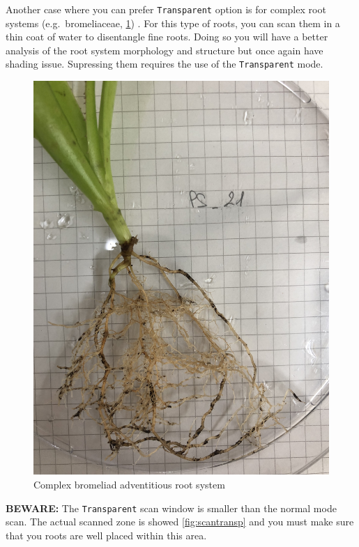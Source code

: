 \documentclass[
  12pt,
  american,
  a4paper,
  extrafontsizes,onecolumn,openright
  ]{memoir}
\begin{document}
\normalsize

Another case where you can prefer \texttt{Transparent} option is for complex root systems (e.g.~bromeliaceae, \ref{fig:bromeroot}) . For this type of roots, you can scan them in a thin coat of water to disentangle fine roots. Doing so you will have a better analysis of the root system morphology and structure but once again have shading issue. Supressing them requires the use of the \texttt{Transparent} mode.

\scriptsize

\begin{figure}

{\centering \includegraphics[width=0.5\linewidth]{document/trait/rootmorpho/bromeroot} 

}

\caption{Complex bromeliad adventitious root system}\label{fig:bromeroot}
\end{figure}

\normalsize

\textbf{BEWARE:} The \texttt{Transparent} scan window is smaller than the normal mode scan. The actual scanned zone is showed \ref{fig:scantransp} and you must make sure that you roots are well placed within this area.

\scriptsize
\end{document}
